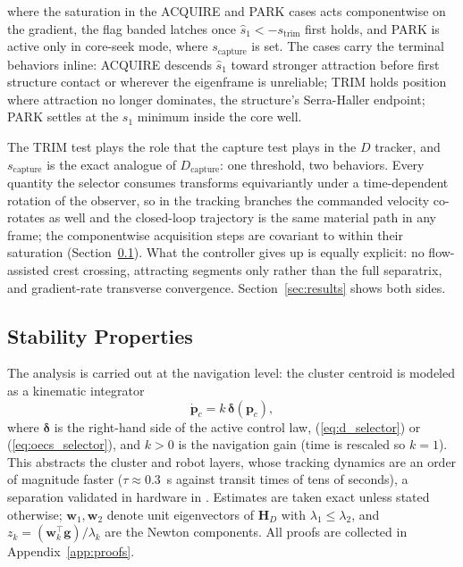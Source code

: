 \documentclass[lettersize,journal]{IEEEtran}
\begin{document}
where the saturation in the ACQUIRE and PARK cases acts componentwise
on the gradient, the flag banded latches once $\hat{s}_1 <
-s_{\text{trim}}$ first holds, and PARK is active only in core-seek
mode, where $s_{\text{capture}}$ is set. The cases carry the terminal
behaviors inline: ACQUIRE descends $\hat{s}_1$ toward stronger
attraction before first structure contact or wherever the eigenframe is
unreliable; TRIM holds position where attraction no longer dominates,
the structure's Serra-Haller endpoint; PARK settles at the $s_1$
minimum inside the core well.

The TRIM test plays the role that the capture test plays in the $D$
tracker, and $s_{\text{capture}}$ is the exact analogue of
$D_{\text{capture}}$: one threshold, two behaviors. Every quantity the
selector consumes
transforms equivariantly under a time-dependent rotation of the
observer, so in the tracking branches the commanded velocity co-rotates
as well and the closed-loop trajectory is the same material path in any
frame; the componentwise acquisition steps are covariant to within
their saturation (Section~\ref{sec:stability}). What the controller
gives up is equally explicit: no flow-assisted crest crossing,
attracting segments only rather than the full separatrix, and
gradient-rate transverse convergence. Section~\ref{sec:results} shows
both sides.

\subsection{Stability Properties}
\label{sec:stability}

The analysis is carried out at the navigation level: the cluster
centroid is modeled as a kinematic integrator
\begin{equation}
    \dot{\mathbf{p}}_c = k\,\boldsymbol{\delta}(\mathbf{p}_c),
    \label{eq:kinematic_model}
\end{equation}
where $\boldsymbol{\delta}$ is the right-hand side of the active
control law, (\ref{eq:d_selector}) or (\ref{eq:oecs_selector}), and
$k > 0$ is the navigation gain (time is rescaled so $k = 1$). This abstracts the
cluster and robot layers, whose tracking dynamics are an order of
magnitude faster ($\tau \approx 0.3$~s against transit times of tens of
seconds), a separation validated in hardware in \cite{14}. Estimates
are taken exact unless stated otherwise; $\mathbf{w}_1, \mathbf{w}_2$
denote unit eigenvectors of $\mathbf{H}_D$ with $\lambda_1 \leq
\lambda_2$, and $z_k = (\mathbf{w}_k^\top \mathbf{g})/\lambda_k$ are
the Newton components. All proofs are collected in
Appendix~\ref{app:proofs}.
\end{document}
